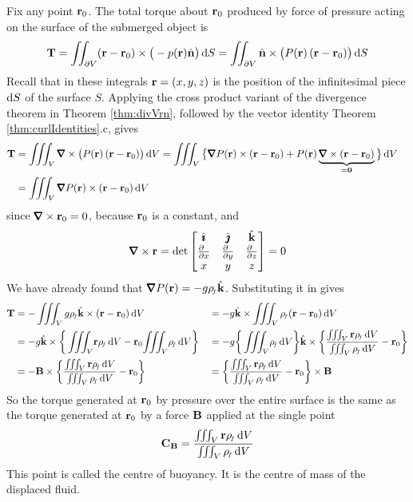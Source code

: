 Fix any point $\mathbf{r}_0$. The total torque about $\mathbf{r}_0$ produced by 
force of pressure acting on the surface of the submerged object is
\begin{equation*}
\mathbf{T}=\iint_{\partial V} (\mathbf{r}-\mathbf{r}_0)\times\big(-p(\mathbf{r})\hat{\mathbf{n}}\big)\,\mathrm{d}S
=\iint_{\partial V} \hat{\mathbf{n}}\times\big(P(\mathbf{r})\, (\mathbf{r}-\mathbf{r}_0)\big)\,\mathrm{d}S
\end{equation*}
Recall that in these integrals $\mathbf{r}=(x,y,z)$ is the position of the 
infinitesimal piece $\mathrm{d}S$ of the surface $S$.
Applying the cross product variant of the divergence theorem in Theorem
\ref{thm:divVrn}, followed by the vector identity 
Theorem \ref{thm:curlIdentities}.c, gives
\begin{align*}
\vT&=\tripInt_V \vnabla\times\big(P(\vr)\,(\vr-\vr_0)\big)\,\dee{V}
=\tripInt_V \big\{\vnabla P(\vr)\times(\vr-\vr_0)
     +P(\vr)\underbrace{\vnabla\times(\vr-\vr_0)}_{=\vZero}\big\}\,\dee{V}\cr
&=\tripInt_V \vnabla P(\vr)\times(\vr-\vr_0)\,\dee{V}
\end{align*}
since $\vnabla\times\vr_0=0$, because $\mathbf{r}_0$ is a constant, and
\begin{equation*}
\vnabla\times\vr=\det\left[\begin{matrix}
                   \hi&\hj&\hk\cr
                   \frac{\partial\hfill}{\partial x}&
                   \frac{\partial\hfill}{\partial y}&
                   \frac{\partial\hfill}{\partial z}\\
                   x&y&z
                  \end{matrix}\right] 
=0
\end{equation*}
We have already found that $\vnabla P(\vr)=-g\rhof\hk$.
Substituting it in gives
\begin{alignat*}{3}
\vT&=-\tripInt_V g\rhof\hk\times(\vr-\vr_0)\,\dee{V}
&&=-g\hk\times\tripInt_V \rhof (\vr-\vr_0)\,\dee{V}\\
&=-g\hk\times\bigg\{\tripInt_V\! \vr\rhof\,\dee{V}
                 -\vr_0\!\tripInt_V\! \rhof\,\dee{V}\bigg\}
&&=-g\bigg\{\tripInt_V\! \rhof\,\dee{V}\bigg\}\hk\times \bigg\{
     \frac{\tripInt_V \vr\rhof\,\dee{V}}{\tripInt_V\rhof\,
                     \dee{V}}-\vr_0\bigg\}\\
&=-\vB\times\bigg\{\frac{\tripInt_V \vr\rhof\,\dee{V}}
                        {\tripInt_V\rhof\,\dee{V}}-\vr_0\bigg\}
&&=\bigg\{\frac{\tripInt_V \vr\rhof\,\dee{V}}
            {\tripInt_V\rhof\,\dee{V}}-\vr_0\bigg\}\times\vB
\end{alignat*}
So the torque generated at $\mathbf{r}_0$ by pressure over the entire surface
is the same as the torque generated at $\mathbf{r}_0$ by a force $\mathbf{B}$ applied at the single point
\begin{equation*}
\mathbf{C}_{\mathbf{B}}=\frac{\iiint_V \mathbf{r}{\rho_{\!{\scriptscriptstyle f}}}\,\mathrm{d}V}{\iiint_V{\rho_{\!{\scriptscriptstyle f}}}\,\mathrm{d}V}
\end{equation*}
This point is called the centre of buoyancy. It is the centre of mass
of the displaced fluid. 

